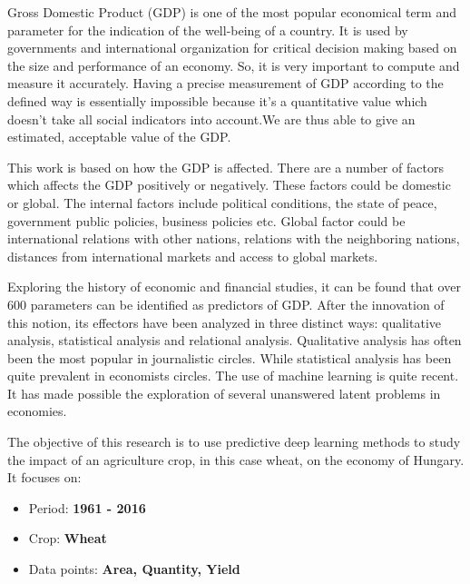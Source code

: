\documentclass[
]{thesis-ekf}
\begin{document}

Gross Domestic Product (GDP) is one of the most popular economical term and parameter for the indication of the well-being of a country. It is used by governments and international organization for critical decision making based on the size and performance of an economy. So, it is very important to compute and measure it accurately. Having a precise measurement of GDP according to the defined way is essentially impossible because it's a quantitative value which doesn't take all social indicators into account.We are thus able to give an estimated, acceptable value of the GDP.

This work is based on how the GDP is affected. There are a number of factors which affects the GDP positively or negatively. These factors could be domestic or global. The internal factors include political conditions, the state of peace, government public policies, business policies etc. Global factor could be international relations with other nations, relations with the neighboring nations, distances from international markets and access to global markets. 


Exploring the history of economic and financial studies, it can be found that over 600 parameters can be identified \cite{richardson2020nowcasting} as predictors of GDP. After the innovation of this notion, its effectors have been analyzed in three distinct ways: qualitative analysis, statistical analysis and relational analysis. Qualitative analysis has often been the most popular in journalistic circles. While statistical analysis has been quite prevalent in economists circles. The use of machine learning is quite recent. It has made possible the exploration of several unanswered latent problems in economies.\cite{richardson2020nowcasting, milavcic2017application, kumar2019novel}


The objective of this research is to use predictive deep learning methods to study the impact of an agriculture crop, in this case wheat, on the economy of Hungary. It focuses on:

\begin{itemize}
	\item Period: \textbf{1961 - 2016}
	\item Crop: \textbf{Wheat}
	\item Data points: \textbf{Area, Quantity, Yield}
\end{itemize}
\end{document}
